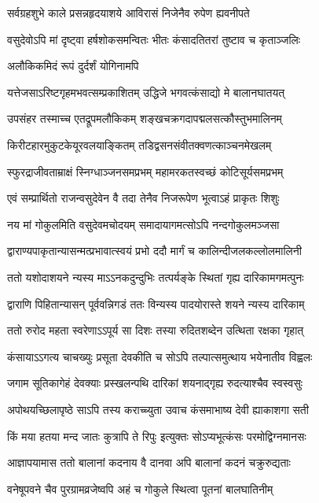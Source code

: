 \twolineshloka
{सर्वग्रहशुभे काले प्रसन्नहृदयाशये}
{आविरासं निजेनैव रुपेण ह्यवनीपते}%

\twolineshloka
{वसुदेवोऽपि मां दृष्ट्वा हर्षशोकसमन्वितः}
{भीतः कंसादतितरां तुष्टाव च कृताञ्जलिः}%

\onelineshloka
{अलौकिकमिदं रूपं दुर्दर्शं योगिनामपि}%

\twolineshloka
{यत्तेजसाऽरिष्टगृहमभवत्सम्प्रकाशितम्}
{उद्धिजे भगवत्कंसाद्यो मे बालानघातयत्}%

\twolineshloka
{उपसंहर तस्माच्च एतद्रूपमलौकिकम्}
{शङ्खचक्रगदापद्मलसत्कौस्तुभमालिनम्}%

\twolineshloka
{किरीटहारमुकुटकेयूरवलयाङ्कितम्}
{तडिद्वसनसंवीतक्वणत्काञ्चनमेखलम्}%

\twolineshloka
{स्फुरद्राजीवताम्राक्षं स्निग्धाञ्जनसमप्रभम्}
{महामरकतस्वच्छं कोटिसूर्यसमप्रभम्}%

\twolineshloka
{एवं सम्प्रार्थितो राजन्वसुदेवेन वै तदा}
{तेनैव निजरूपेण भूत्वाऽहं प्राकृतः शिशुः}%

\twolineshloka
{नय मां गोकुलमिति वसुदेवमचोदयम्}
{समादायागमत्सोऽपि नन्दगोकुलमञ्जसा}%

\twolineshloka
{द्वाराण्यपाकृतान्यासन्मत्प्रभावात्स्वयं प्रभो}
{ददौ मार्गं च कालिन्दीजलकल्लोलमालिनी}%

\twolineshloka
{ततो यशोदाशयने न्यस्य माऽऽनकदुन्दुभिः}
{तत्पर्यङ्के स्थितां गृह्य दारिकामगमत्पुनः}%

\twolineshloka
{द्वाराणि पिहितान्यासन् पूर्ववन्निगडं ततः}
{विन्यस्य पादयोरास्ते शयने न्यस्य दारिकाम्}%

\twolineshloka
{ततो रुरोद महता स्वरेणाऽऽपूर्य सा दिशः}
{तस्या रुदितशब्देन उत्थिता रक्षका गृहात्}%

\twolineshloka
{कंसायाऽऽगत्य चाचख्युः प्रसूता देवकीति च}
{सोऽपि तल्पात्समुत्थाय भयेनातीव विह्वलः}%

\twolineshloka
{जगाम सूतिकागेहं देवक्याः प्रस्खलन्पथि}
{दारिकां शयनाद्गृह्य रुदत्याश्चैव स्वस्वसुः}%

\twolineshloka
{अपोथयच्छिलापृष्ठे साऽपि तस्य कराच्च्युता}
{उवाच कंसमाभाष्य देवी ह्याकाशगा सती}%

\twolineshloka
{किं मया हतया मन्द जातः कुत्रापि ते रिपुः}
{इत्युक्तः सोऽप्यभूत्कंसः परमोद्विग्नमानसः}%

\twolineshloka
{आज्ञापयामास ततो बालानां कदनाय वै}
{दानवा अपि बालानां कदनं चक्रुरुद्यताः}%

\twolineshloka
{वनेषूपवने चैव पुरग्रामव्रजेष्वपि}
{अहं च गोकुले स्थित्वा पूतनां बालघातिनीम्}%


